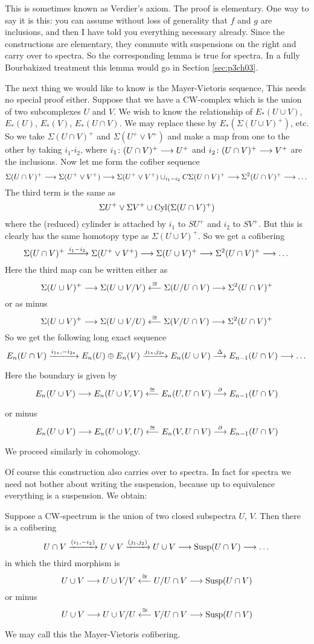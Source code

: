 \documentclass[../main]{subfiles}
\begin{document}
This is sometimes known as Verdier's axiom. The proof is elementary. One way to say it is this: you can assume without loss of generality that $f$ and $g$ are inclusions, and then I have told you everything necessary already. Since the constructions are elementary, they commute with suspensions on the right and carry over to spectra. So the corresponding lemma is true for spectra. In a fully Bourbakized treatment this lemma would go in Section \ref{sec:p3ch03}. 

The next thing we would like to know is the Mayer-Vietoris sequence, This needs no special proof either. Suppose that we have a CW-complex which is the union of two subcomplexes $U$ and $V$. We wish to know the relationship of $E_\ast(U\cup V)$, $E_\ast(U)$, $E_\ast(V)$, $E_\ast(U\cap V)$. We may replace these by $E_\ast(\Sigma (U\cup V)^+)$, etc. So we take $\Sigma (U\cap V)^+$ and $\Sigma (U^+\vee V^+)$ and make a map from one to the other by taking $i_1$-$i_2$, where $i_1\colon (U\cap V)^+\longrightarrow U^+$ and $i_2\colon (U\cap V)^+\longrightarrow V^+$ are the inclusions. Now let me form the cofiber sequence
\[\Sigma (U\cap V)^+ \longrightarrow \Sigma (U^+\vee V^+) \longrightarrow \Sigma (U^+\vee V^+)\cup_{i_1-i_2} C\Sigma (U\cap V)^+ \longrightarrow \Sigma^2(U\cap V)^+\longrightarrow\dots\]
The third term is the same as
\[\Sigma U^+\vee \Sigma V^+\cup \mathrm{Cyl}(\Sigma(U\cap V)^+)\]
where the (reduced) cylinder is attached by $i_1$ to $SU^+$ and $i_2$ to $SV^+$. But this is clearly has the same homotopy type as $\Sigma(U\cup V)^+$. So we get a cofibering
\[\Sigma(U\cap V)^+ \vra{i_1-i_2} \Sigma(U^+\vee V^+) \lra \Sigma(U\cup V)^+ \lra \Sigma^2(U\cap V)^+\lra\dots\]
Here the third map can be written either as
\[\Sigma(U\cup V)^+\longrightarrow \Sigma(U\cup V/V) \overset{\cong}{\longleftarrow} \Sigma(U/U\cap V)\longrightarrow \Sigma^2(U\cap V)^+\]
or as minus
\[\Sigma(U\cup V)^+\longrightarrow \Sigma(U\cup V/U) \overset{\cong}{\longleftarrow} \Sigma(V/U\cap V)\longrightarrow \Sigma^2(U\cap V)^+\]
So we get the following long exact sequence
\[E_n(U\cap V)\vra{i_{1\ast}, -i_{2\ast}} E_n(U)\oplus E_n(V) \vra{j_{1\ast}, j_{2\ast}} E_n(U\cup V)\vra{\Delta}E_{n-1}(U\cap V) \lra \dots\]
Here the boundary is given by
\[E_n(U\cup V) \lra E_n(U\cup V, V) \lal{\cong}E_n(U, U\cap V)\vra{\partial} E_{n-1}(U\cap V)\]
or minus
\[E_n(U\cup V) \lra E_n(U\cup V, U) \lal{\cong}E_n(V, U\cap V)\vra{\partial} E_{n-1}(U\cap V)\]
We proceed similarly in cohomology.

Of course this construction also carries over to spectra. In fact for spectra we need not bother about writing the suspension, because up to equivalence everything is a suspension. We obtain:
\begin{lemma}\label{lem:p3c06.9}
Suppose a CW-spectrum is the union of two closed subspectra $U$, $V$. Then there is a cofibering
\[U\cap V\vra{(i_1, -i_2)}U\vee V \vra{(j_1, j_2)}U\cup V\lra \te{Susp}(U\cap V)\lra \dots\]
in which the third morphism is
\[U\cup V\longrightarrow U\cup V/V\overset{\cong}{\longleftarrow}U/U\cap V\longrightarrow \mathrm{Susp}(U\cap V)\]
or minus
\[U\cup V\longrightarrow U\cup V/U\overset{\cong}{\longleftarrow}V/U\cap V\longrightarrow \mathrm{Susp}(U\cap V)\]
\end{lemma}
We may call this the Mayer-Vietoris cofibering.
\end{document}
